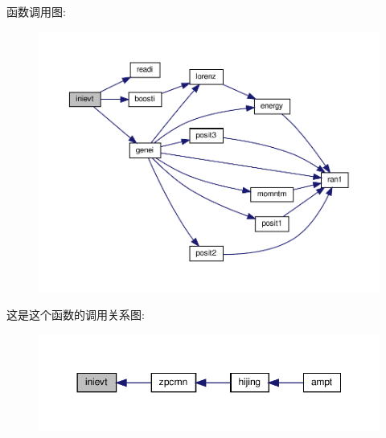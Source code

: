 函数调用图\+:
\nopagebreak
\begin{figure}[H]
\begin{center}
\leavevmode
\includegraphics[width=350pt]{inievt_8f90_a10f76393d43ebe5bb556281a70243ce2_cgraph}
\end{center}
\end{figure}
这是这个函数的调用关系图\+:
\nopagebreak
\begin{figure}[H]
\begin{center}
\leavevmode
\includegraphics[width=350pt]{inievt_8f90_a10f76393d43ebe5bb556281a70243ce2_icgraph}
\end{center}
\end{figure}
